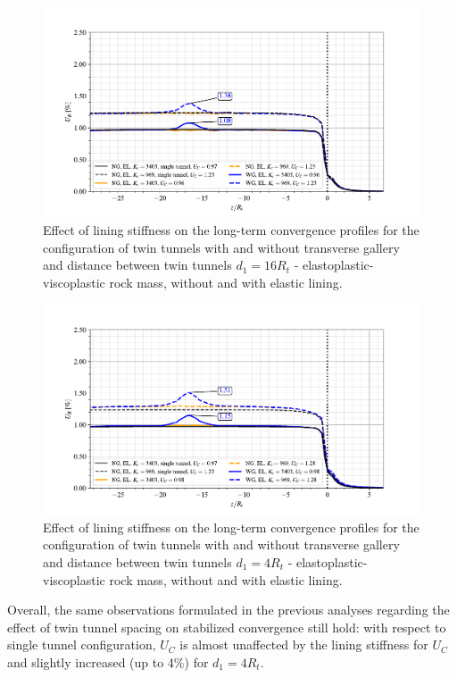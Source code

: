 \documentclass[a4paper,fleqn]{cas-sc}
\begin{document}
\begin{figure}[h!]
	\centering
	\includegraphics[scale=0.9]{Convergence Profiles - EPVP_EL_VEL_d1_16Ri_anotate.pdf}
	\caption{Effect of lining stiffness on the long-term convergence profiles for the configuration of twin tunnels with and without transverse gallery and distance between twin tunnels $d_1=16R_t$ - elastoplastic-viscoplastic rock mass, without and with elastic lining.}
	\label{EPVP_EL_VEL_d1_16Ri}
\end{figure}
\FloatBarrier
\begin{figure}[h!]
	\centering
	\includegraphics[scale=0.9]{Convergence Profiles - EPVP_EL_VEL_d1_4Ri_anotate.pdf}
	\caption{Effect of lining stiffness on the long-term convergence profiles for the configuration of twin tunnels with and without transverse gallery and distance between twin tunnels $d_1=4R_t$ - elastoplastic-viscoplastic rock mass, without and with elastic lining.}
	\label{EPVP_EL_VEL_d1_4Ri}
\end{figure}
\FloatBarrier

Overall, the same observations formulated in the previous analyses regarding the effect of twin tunnel spacing on stabilized convergence still hold: with respect to single tunnel configuration, $U_C$ is almost unaffected by the lining stiffness for $U_C$  and slightly increased (up to 4\%) for $d_1=4R_t$.
\end{document}
